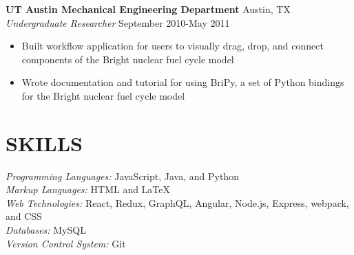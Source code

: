 \documentclass[line,margin,letterpaper]{res}
\begin{document}
\begin{resume}
  {\bf UT Austin Mechanical Engineering Department} \hfill Austin, TX \\
  \emph{Undergraduate Researcher} \hfill September 2010-May 2011
  \begin{itemize} \itemsep -2pt
    \item Built workflow application for users to visually drag, drop, and 
    connect components of the Bright nuclear fuel cycle model
    \item Wrote documentation and tutorial for using BriPy, a set of Python
    bindings for the Bright nuclear fuel cycle model
  \end{itemize}
 

\section{SKILLS}
  \emph{Programming Languages:} JavaScript, Java, and Python\\
  \emph{Markup Languages:} HTML and \LaTeX \\
  \emph{Web Technologies:} React, Redux, GraphQL, Angular, Node.js,
  Express, webpack, and CSS \\
  \emph{Databases:} MySQL \\
  \emph{Version Control System:} Git \\
\end{resume}
\end{document}
